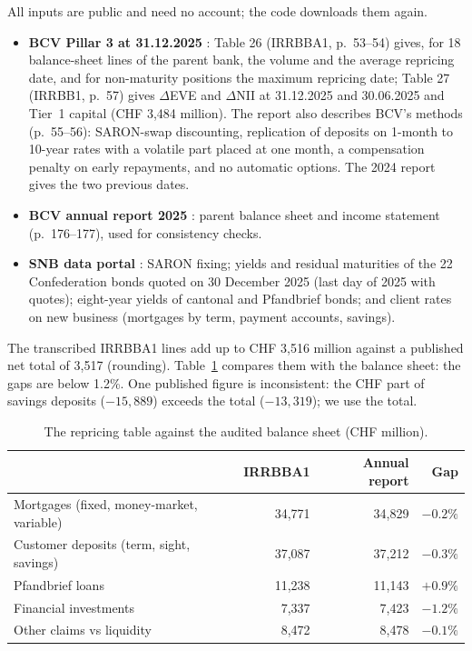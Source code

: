 \documentclass[11pt,a4paper]{article}
\newcommand{\dEVE}{$\Delta$EVE}
\newcommand{\dNII}{$\Delta$NII}
\begin{document}
All inputs are public and need no account; the code downloads them again.
\begin{itemize}
  \item \textbf{BCV Pillar 3 at 31.12.2025} \citep{bcvpillar3}: Table 26 (IRRBBA1, p.~53--54) gives, for 18 balance-sheet lines of the parent bank, the volume and the average repricing date, and for non-maturity positions the maximum repricing date; Table 27 (IRRBB1, p.~57) gives \dEVE{} and \dNII{} at 31.12.2025 and 30.06.2025 and Tier~1 capital (CHF 3,484 million). The report also describes BCV's methods (p.~55--56): SARON-swap discounting, replication of deposits on 1-month to 10-year rates with a volatile part placed at one month, a compensation penalty on early repayments, and no automatic options. The 2024 report \citep{bcvpillar3b} gives the two previous dates.
  \item \textbf{BCV annual report 2025} \citep{bcvar}: parent balance sheet and income statement (p.~176--177), used for consistency checks.
  \item \textbf{SNB data portal} \citep{snbdata}: SARON fixing; yields and residual maturities of the 22 Confederation bonds quoted on 30 December 2025 (last day of 2025 with quotes); eight-year yields of cantonal and Pfandbrief bonds; and client rates on new business (mortgages by term, payment accounts, savings).
\end{itemize}
The transcribed IRRBBA1 lines add up to CHF 3,516 million against a published net total of 3,517 (rounding). Table~\ref{tab:check} compares them with the balance sheet: the gaps are below 1.2\%. One published figure is inconsistent: the CHF part of savings deposits ($-15{,}889$) exceeds the total ($-13{,}319$); we use the total.

\begin{table}[h]
\centering
\caption{The repricing table against the audited balance sheet (CHF million).}
\label{tab:check}
\begin{tabular}{lrrr}
\toprule
 & IRRBBA1 & Annual report & Gap \\
\midrule
Mortgages (fixed, money-market, variable) & 34,771 & 34,829 & $-0.2\%$ \\
Customer deposits (term, sight, savings) & 37,087 & 37,212 & $-0.3\%$ \\
Pfandbrief loans & 11,238 & 11,143 & $+0.9\%$ \\
Financial investments & 7,337 & 7,423 & $-1.2\%$ \\
Other claims vs liquidity & 8,472 & 8,478 & $-0.1\%$ \\
\bottomrule
\end{tabular}
\end{table}
\end{document}
